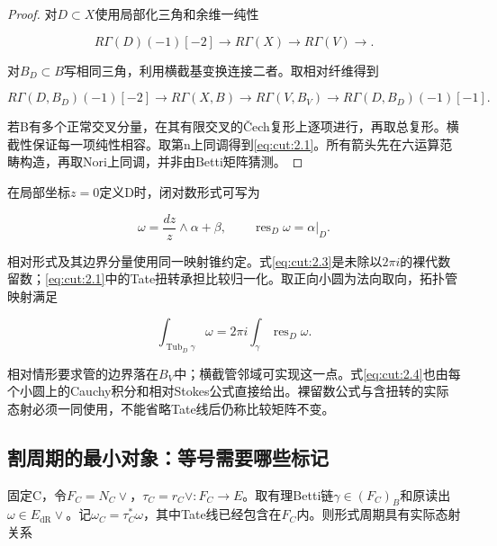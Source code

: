 \documentclass[11pt,a4paper,oneside]{ctexart}
\theoremstyle{cnplain}
\theoremstyle{definition}
\theoremstyle{remark}
\numberwithin{equation}{section}
\begin{document}
\begin{proof}

对\(D\subset X\)使用局部化三角和余维一纯性

\begin{equation}
R\Gamma(D)(-1)[-2]\to R\Gamma(X)\to R\Gamma(V)\to.
\end{equation}

对\(B_D\subset B\)写相同三角，利用横截基变换连接二者。取相对纤维得到

\begin{equation}
R\Gamma(D,B_D)(-1)[-2]\to R\Gamma(X,B)
 \to R\Gamma(V,B_V)\to R\Gamma(D,B_D)(-1)[-1].         \label{eq:cut:2.2}
\end{equation}

若B有多个正常交叉分量，在其有限交叉的Čech复形上逐项进行，再取总复形。横截性保证每一项纯性相容。取第n上同调得到\eqref{eq:cut:2.1}。所有箭头先在六运算范畴构造，再取Nori上同调，并非由Betti矩阵猜测。

\end{proof}

在局部坐标\(z=0\)定义D时，闭对数形式可写为

\begin{equation}
\omega=\frac{dz}{z}\wedge\alpha+\beta,
 \qquad\operatorname{res}_D\omega=\alpha|_D.           \label{eq:cut:2.3}
\end{equation}

相对形式及其边界分量使用同一映射锥约定。式\eqref{eq:cut:2.3}是未除以\(2\pi i\)的裸代数留数；\eqref{eq:cut:2.1}中的Tate扭转承担比较归一化。取正向小圆为法向取向，拓扑管映射满足

\begin{equation}
\int_{\operatorname{Tub}_D\gamma}\omega
       =2\pi i\int_\gamma\operatorname{res}_D\omega.   \label{eq:cut:2.4}
\end{equation}

相对情形要求管的边界落在\(B_V\)中；横截管邻域可实现这一点。式\eqref{eq:cut:2.4}也由每个小圆上的Cauchy积分和相对Stokes公式直接给出。裸留数公式与含扭转的实际态射必须一同使用，不能省略Tate线后仍称比较矩阵不变。


\subsection{割周期的最小对象：等号需要哪些标记}\label{sec:cut:4}

固定C，令\(F_C=N_C\vee \)，\(\tau _C=r_C\vee :F_C\to E\)。取有理Betti链\(\gamma \in (F_C)_B\)和原读出\(\omega \in E_{\mathrm{dR}}\vee \)。记\(\omega _C=\tau _C^\ast \omega \)，其中Tate线已经包含在\(F_C\)内。则形式周期具有实际态射关系
\end{document}
